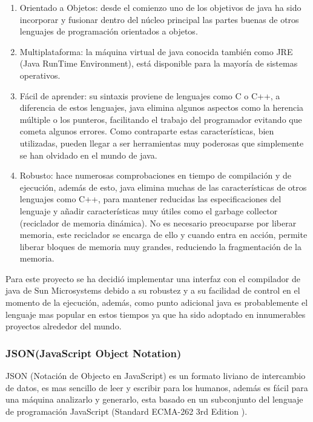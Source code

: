 \begin{enumerate}
	
	\item Orientado a Objetos: desde el comienzo uno de los objetivos de java ha sido incorporar y fusionar dentro del núcleo principal las partes buenas de otros lenguajes de programación orientados a objetos.
	
	\item Multiplataforma: la máquina virtual de java conocida también como JRE (Java RunTime Environment), está disponible para la mayoría de sistemas operativos.
	
	\item Fácil de aprender: su sintaxis proviene de lenguajes como C o C++, a diferencia de estos lenguajes, java elimina algunos aspectos como la herencia múltiple o los punteros, facilitando el trabajo del programador evitando que cometa algunos errores. Como contraparte estas características, bien utilizadas, pueden llegar a ser herramientas muy poderosas que simplemente se han olvidado en el mundo de java.
	
	\item Robusto: hace numerosas comprobaciones en tiempo de compilación y de ejecución, además de esto, java elimina muchas de las características de otros lenguajes como C++, para mantener reducidas las especificaciones del lenguaje y añadir características muy útiles como el garbage collector (reciclador de memoria dinámica). No es necesario preocuparse por liberar memoria, este reciclador se encarga de ello y cuando entra en acción, permite liberar bloques de memoria muy grandes, reduciendo la fragmentación de la memoria.
	
\end{enumerate}

Para este proyecto se ha decidió implementar una interfaz con el compilador de java de Sun Microsystems debido a su robustez y a su facilidad de control en el momento de la ejecución, además, como punto adicional java es probablemente el lenguaje mas popular en estos tiempos ya que ha sido adoptado en innumerables proyectos alrededor del mundo.


\subsubsection*{JSON(JavaScript Object Notation) \cite{json} }
\label{tec:json}

JSON (Notación de Objecto en JavaScript) es un formato liviano de intercambio de datos, es mas sencillo de leer y escribir para los humanos, además es fácil para una máquina analizarlo y generarlo, esta basado en un subconjunto del lenguaje de programación JavaScript (Standard ECMA-262 3rd Edition \cite{json_ecma}).

